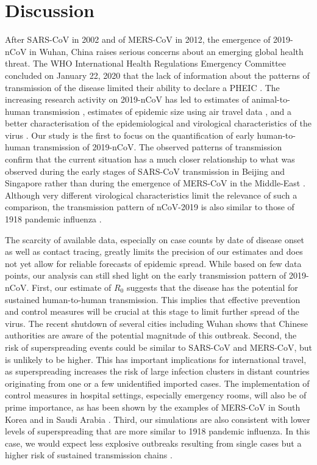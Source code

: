 \documentclass[a4]{article}
\begin{document}
\section*{Discussion}

After SARS-CoV in 2002 and of MERS-CoV in 2012, the emergence of 2019-nCoV in Wuhan, China raises serious concerns about an emerging global health threat.
The WHO International Health Regulations Emergency Committee concluded on January 22, 2020 that the lack of information about the patterns of transmission of the disease limited their ability to declare a PHEIC \cite{whoreco}.
The increasing research activity on 2019-nCoV has led to estimates of animal-to-human transmission \cite{Chen2020.01.19.911669}, estimates of epidemic size using air travel data \cite{Imai:2020, vespi:2020}, and a better characterisation of the epidemiological and virological characteristics of the virus \cite{peng2020real,Shi:2020}.
Our study is the first to focus on the quantification of early human-to-human transmission of 2019-nCoV.
The observed patterns of transmission confirm that the current situation has a much closer relationship to what was observed during the early stages of SARS-CoV transmission in Beijing and Singapore rather than during the emergence of MERS-CoV in the Middle-East \cite{Lloyd-Smith:2005,Kucharski:2015b}.
Although very different virological characteristics limit the relevance of such a comparison, the transmission pattern of nCoV-2019 is also similar to those of 1918 pandemic influenza \cite{Fraser:2011}.

The scarcity of available data, especially on case counts by date of disease onset as well as contact tracing, greatly limits the precision of our estimates and does not yet allow for reliable forecasts of epidemic spread.
While based on few data points, our analysis can still shed light on the early transmission pattern of 2019-nCoV.
First, our estimate of $R_0$ suggests that the disease has the potential for sustained human-to-human transmission.
This implies that effective prevention and control measures will be crucial at this stage to limit further spread of the virus.
The recent shutdown of several cities including Wuhan shows that Chinese authorities are aware of the potential magnitude of this outbreak.
Second, the risk of superspreading events could be similar to SARS-CoV and MERS-CoV, but is unlikely to be higher.
This has important implications for international travel, as superspreading increases the risk of large infection clusters in distant countries originating from one or a few unidentified imported cases.
The implementation of control measures in hospital settings, especially emergency rooms, will also be of prime importance, as has been shown by the examples of MERS-CoV in South Korea \cite{oh2015middle} and in Saudi Arabia \cite{assiri2013hospital}.
Third, our simulations are also consistent with lower levels of superspreading that are more similar to 1918 pandemic influenza. In this case, we would expect less explosive outbreaks resulting from single cases but a higher risk of sustained transmission chains \cite{Lloyd-Smith:2005}.
\end{document}
